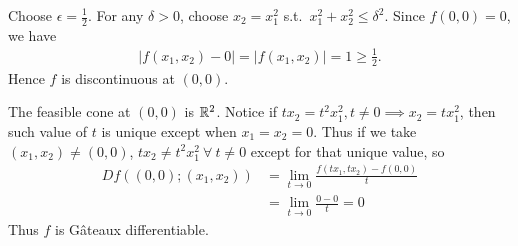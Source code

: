 \documentclass[12pt]{article}
\begin{document}
\begin{problem}[8]
Choose $ \epsilon = \frac{1}{2}$. For any $ \delta > 0$, choose $ x_2= x_1^2$ s.t.\ $ x_1^2+x_2^2\leq \delta^2$. Since $ f(0,0)=0$, we have
\begin{align*}
	|f(x_1,x_2) - 0| = |f(x_1,x_2)| = 1 \geq \frac{1}{2}.
\end{align*}
Hence $ f$ is discontinuous at  $ (0,0)$.

The feasible cone at $ (0,0)$ is  $ \mathbb{R}^2$. Notice if $ t x_2 = t^2 x_1^2, t\neq 0 \implies x_2 = t x_1^2$, then such value of $ t$ is unique except when  $ x_1=x_2=0$. Thus if we take $ (x_1,x_2) \neq (0,0)$, $ t x_2 \neq t^2 x_1^2 \ \forall \ t \neq 0$ except for that unique value, so
\begin{align*}
	Df((0,0);(x_1,x_2))&= \lim_{ t \to 0}  \frac{f(tx_1,tx_2)-f(0,0)}{ t} \\
	&= \lim_{ t \to 0} \frac{0-0}{ t} =0
\end{align*}
Thus $ f$ is G\^{a}teaux differentiable.
\end{problem}
\end{document}
